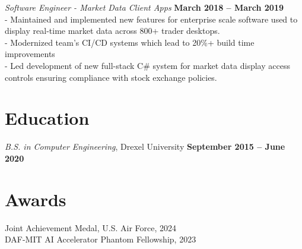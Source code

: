 \documentclass[margin,line]{resume}
\begin{document}
\begin{resume}
    \textsl{Software Engineer - Market Data Client Apps} \hfill \textbf{March 2018 -- March 2019}\\
    - Maintained and implemented new features for enterprise scale software used to display real-time market data across 800+ trader desktops.\vspace{1mm}\\%
    - Modernized team's CI/CD systems which lead to 20\%+ build time improvements\vspace{1mm}\\%
    - Led development of new full-stack C\# system for market data display access controls ensuring compliance with stock exchange policies.
 
    \section{\mysidestyle Education}

    \textsl{B.S. in Computer Engineering}, Drexel University \hfill \textbf{ September 2015 -- June 2020}\vspace{-3mm}\\\vspace{-1mm}%


    \section{\mysidestyle Awards}
    Joint Achievement Medal, U.S. Air Force, 2024\vspace{1mm}\\%
    DAF-MIT AI Accelerator Phantom Fellowship, 2023\vspace{1mm}





\end{resume}
\end{document}
